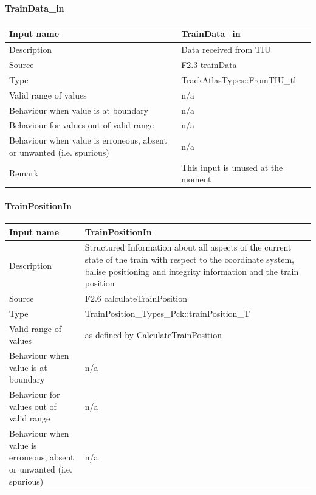 \paragraph{TrainData\_in}

\begin{longtable}{p{}p{}}
\toprule
Input name				& TrainData\_in\\
\midrule
Description				& Data received from TIU\\
\midrule
Source					& F2.3 trainData \\ 
\midrule
Type					& TrackAtlasTypes::FromTIU\_tl \\
\midrule
Valid range of values	& n/a\\
\midrule
Behaviour when value is at boundary	& n/a\\
\midrule
Behaviour for values out of valid range	& n/a\\
\midrule
Behaviour when value is erroneous, absent or unwanted (i.e. spurious) & n/a\\
\midrule
Remark & This input is unused at the moment\\

\bottomrule
\end{longtable}

\paragraph{TrainPositionIn}

\begin{longtable}{p{}p{}}
\toprule
Input name				& TrainPositionIn\\
\midrule
Description				& Structured Information about all aspects of the current state of the train with respect to the coordinate system, balise positioning and integrity information and the train position\\
\midrule
Source					& F2.6 calculateTrainPosition \\ 
\midrule
Type					& TrainPosition\_Types\_Pck::trainPosition\_T \\
\midrule
Valid range of values	& as defined by CalculateTrainPosition \\
\midrule
Behaviour when value is at boundary	& n/a\\
\midrule
Behaviour for values out of valid range	& n/a\\
\midrule
Behaviour when value is erroneous, absent or unwanted (i.e. spurious) & n/a\\
\bottomrule
\end{longtable}

